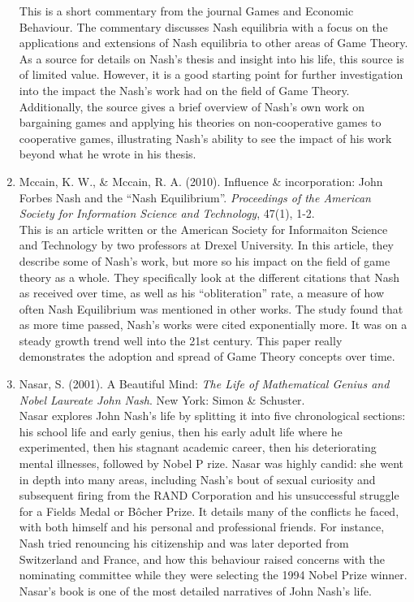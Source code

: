 \documentclass[11pt]{article}
\begin{document}
\begin{enumerate}
This is a short commentary from the journal Games and Economic Behaviour. The commentary discusses Nash equilibria with a focus on the applications and extensions of Nash equilibria to other areas of Game Theory. As a source for details on Nash’s thesis and insight into his life, this source is of limited value. However, it is a good starting point for further investigation into the impact the Nash’s work had on the field of Game Theory. Additionally, the source gives a brief overview of Nash’s own work on bargaining games and applying his theories on non-cooperative games to cooperative games, illustrating Nash’s ability to see the impact of his work beyond what he wrote in his thesis.\\

\item Mccain, K. W., \& Mccain, R. A. (2010). Influence \& incorporation: John Forbes Nash and the “Nash Equilibrium”. \textit{Proceedings of the American Society for Information Science and Technology}, 47(1), 1-2.\\

This is an article written or the American Society for Informaiton Science and Technology by two professors at Drexel University. In this article, they describe some of Nash’s work, but more so his impact on the field of game theory as a whole. They specifically look at the different citations that Nash as received over time, as well as his “obliteration” rate, a measure of how often Nash Equilibrium was mentioned in other works. The study found that as more time passed, Nash’s works were cited exponentially more. It was on a steady growth trend well into the 21st century. This paper really demonstrates the adoption and spread of Game Theory concepts over time.\\ 

\item Nasar, S. (2001). A Beautiful Mind: \textit{The Life of Mathematical Genius and Nobel Laureate John Nash}. New York: Simon \& Schuster.\\

Nasar explores John Nash’s life by splitting it into five chronological sections: his school life and early genius, then his early adult life where he experimented, then his stagnant academic career, then his deteriorating mental illnesses, followed by Nobel P
rize.  Nasar was highly candid: she went in depth into many areas, including Nash’s bout of sexual curiosity and subsequent firing from the RAND Corporation and his unsuccessful struggle for a Fields Medal or Bôcher Prize. It details many of the conflicts he 
faced, with both himself and his personal and professional
 friends. For instance, Nash tried renouncing his citizenship and was later deported from Switzerland and France, and how this behaviour raised concerns with the nominating committee while they were selecting the 1994 Nobel Prize winner. Nasar’s book is one of the most detailed narratives of John Nash’s life.\\ 
 

\end{enumerate}
\end{document}

